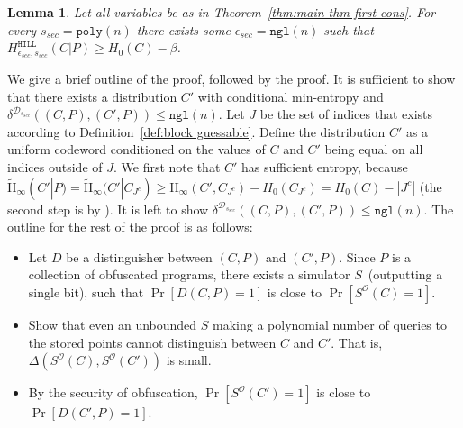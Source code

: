 \documentclass[11pt]{article}
\newtheorem{lemma}[theorem]{Lemma}
\newcommand{\thref}[1]{\mbox{Theorem~\ref{#1}}}
\newcommand{\defref}[1]{\mbox{Definition~\ref{#1}}}
\newcommand{\hill}{\ensuremath{\mathtt{HILL}}\xspace}
\newcommand{\poly}{\ensuremath{\mathtt{poly}}\xspace}
\newcommand{\ngl}{\ensuremath{\mathtt{ngl}}\xspace}
\newcommand{\Hoo}{\mathrm{H}_\infty}
\newcommand{\Hav}{\tilde{\mathrm{H}}_\infty}
\begin{document}
\begin{lemma}
\label{lem:security of cons}
Let all variables be as in \thref{thm:main thm first cons}.  For every $s_{sec} = \poly(n)$ there exists some $\epsilon_{sec} = \ngl(n)$ such that $H^{\hill}_{\epsilon_{sec}, s_{sec}}( C | P ) \geq H_0(C) - \beta$.
\end{lemma}

We give a brief outline of the proof, followed by the proof.
It is sufficient to show that there exists a distribution $C'$ with conditional min-entropy and $\delta^{\mathcal{D}_{s_{sec}}}((C, P), (C', P))\le \ngl(n)$.  Let $J$ be the set of indices that exists according to \defref{def:block guessable}. Define the distribution $C'$ as a uniform codeword conditioned on the values of $C$ and $C'$ being equal on all indices outside of $J$.  We first note that $C'$ has sufficient entropy, because $\Hav(C' |P) = \Hav(C' | C_{J^c}) \ge \Hoo(C', C_{J^c}) - H_0(C_{J^c})  = H_0(C) - |J^c|$ (the second step is by \cite[Lemma 2.2b]{DBLP:journals/siamcomp/DodisORS08}).  It is left to show $\delta^{\mathcal{D}_{s_{sec}}}((C, P), (C', P)) \le \ngl(n)$.
The outline for the rest of the proof is as follows:
\begin{itemize}
\item Let $D$ be a distinguisher between $(C, P)$ and $(C', P)$. Since $P$ is a collection of obfuscated programs, there exists a simulator $S$~(outputting a single bit), such that $\Pr[D(C, P)=1]$ is close to $\Pr[S^{\mathcal{O}}(C)=1]$.
\item Show that even an unbounded $S$ making a polynomial number of queries to the stored points cannot distinguish between $C$ and $C'$.  That is, $\Delta(S^{\mathcal{O}}(C),S^{\mathcal{O}}(C'))$ is small.
\item By the security of obfuscation, $\Pr[S^{\mathcal{O}}(C')=1]$ is close to $\Pr[D(C', P)=1]$.
\end{itemize}
\end{document}
